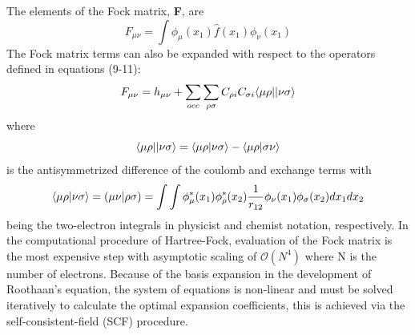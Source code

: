    The elements of the Fock matrix, \textbf{F}, are
      \begin{equation}
      F_{\mu\nu} = \int \phi_\mu(x_1) \hat{f}(x_1) \phi_\nu(x_1) 
      \end{equation}
    The Fock matrix terms can also be expanded with respect to the operators defined in equations (9-11):
      \begin{equation}
      F_{\mu\nu} = h_{\mu\nu} + \sum_{occ}\sum_{\rho \sigma} C_{\rho i} C_{\sigma i} \langle\mu \rho || \nu \sigma \rangle
      \end{equation}
    where 
      \begin{equation}
      \langle\mu \rho || \nu \sigma \rangle = \langle\mu \rho|\nu \sigma\rangle - \langle\mu \rho|\sigma \nu\rangle
      \end{equation}
    is the antisymmetrized difference of the coulomb and exchange terms with 
      \begin{equation}
      \langle\mu \rho|\nu \sigma\rangle = (\mu \nu | \rho \sigma) = \int \int \phi^*_\mu(x_1) \phi^*_\rho(x_2) \frac{1}{r_{12}} \phi_\nu (x_1) \phi_\sigma(x_2) dx_1 dx_2
      \end{equation}
    being the two-electron integrals in physicist and chemist notation, respectively. In the computational procedure of Hartree-Fock, evaluation of the Fock matrix is the most expensive step with asymptotic scaling of $\mathcal{O}(N^4)$ where N is the number of electrons. Because of the basis expansion in the development of Roothaan's equation, the system of equations is non-linear and must be solved iteratively to calculate the optimal expansion coefficients, this is achieved via the self-consistent-field (SCF) procedure.


